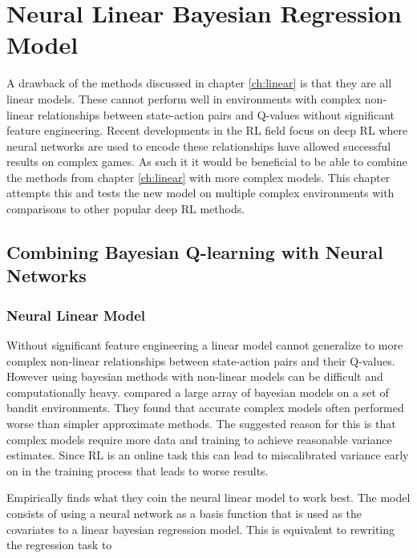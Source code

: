 
\chapter{Neural Linear Bayesian Regression Model}\label{ch:bdqn}

A drawback of the methods discussed in chapter \ref{ch:linear} is that they are all linear models. These cannot perform well in environments with complex non-linear relationships between state-action pairs and Q-values without significant feature engineering. Recent developments in the RL field focus on deep RL where neural networks are used to encode these relationships have allowed successful results on complex games\citep{mnih_2015, mnih_2016,silver_2017}. As such it it would be beneficial to be able to combine the methods from chapter \ref{ch:linear} with more complex models. This chapter attempts this and tests the new model on multiple complex environments with comparisons to other popular deep RL methods.

\section{Combining Bayesian Q-learning with Neural Networks}

\subsection{Neural Linear Model}

Without significant feature engineering a linear model cannot generalize to more complex non-linear relationships between state-action pairs and their Q-values. However using bayesian methods with non-linear models can be difficult and computationally heavy. \cite{carlos_2018} compared a large array of bayesian models on a set of bandit environments. They found that accurate complex models often performed worse than simpler approximate methods. The suggested reason for this is that complex models require more data and training to achieve reasonable variance estimates. Since RL is an online task this can lead to miscalibrated variance early on in the training process that leads to worse results.

Empirically \cite{carlos_2018} finds what they coin the neural linear model to work best. The model consists of using a neural network as a basis function that is used as the covariates to a linear bayesian regression model. This is equivalent to rewriting the regression task to 

